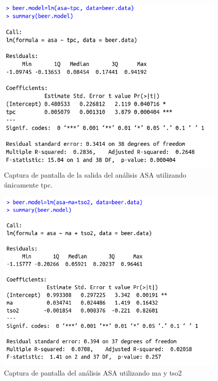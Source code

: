\documentclass{article}
\begin{document}
\begin{figure}[htbp]
    \centering
    \includegraphics[scale=0.4]{images/asa_1_variable.png}
    \caption{Captura de pantalla de la salida del análisis ASA utilizando únicamente tpc.}
    \label{fig:asa_1_variable}
\end{figure}

\begin{figure}[htbp]
    \centering
    \includegraphics[scale=0.4]{images/asa_2_variables.png}
    \caption{Captura de pantalla del análisis ASA utilizando ma y tso2}
    \label{fig:asa_2_variables}
\end{figure}
\end{document}

